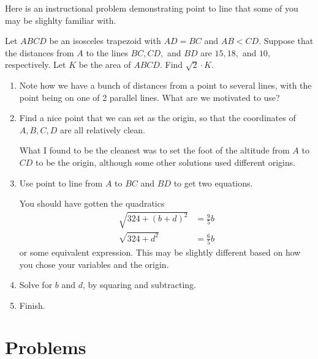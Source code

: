 \documentclass{article}
\begin{document}
Here is an instructional problem demonstrating point to line that some of you may be slighlty familiar with. 
\begin{exam}[AIME I 2021/9]
Let $ABCD$ be an isosceles trapezoid with $AD=BC$ and $AB<CD.$ Suppose that the distances from $A$ to the lines $BC,CD,$ and $BD$ are $15,18,$ and $10,$ respectively. Let $K$ be the area of $ABCD.$ Find $\sqrt2 \cdot K.$
\end{exam}

\begin{walk}

\begin{enumerate}
    \item Note how we have a bunch of distances from a point to several lines, with the point being on one of 2 parallel lines. What are we motivated to use?
    \item Find a nice point that we can set as the origin, so that the coordinates of $A,B,C,D$ are all relatively clean.
    
    What I found to be the cleanest was to set the foot of the altitude from $A$ to $CD$ to be the origin, although some other solutions used different origins. 
    
    \item Use point to line from $A$ to $BC$ and $BD$ to get two equations.
    
    You should have gotten the quadratics 
    \begin{align*}
        \sqrt{324+(b+d)^2}&=\frac{9}{5}b\\
        \sqrt{324+d^2}&=\frac{6}{5}b
    \end{align*}
    or some equivalent expression. This may be slightly different based on how you chose your variables and the origin. 
    \item Solve for $b$ and $d$, by squaring and subtracting. 
    \item Finish. 
\end{enumerate}

\end{walk}

\pagebreak
\section{Problems}



\end{document}
